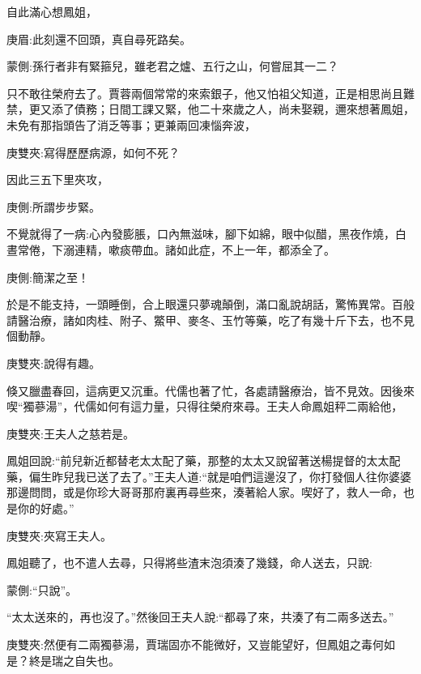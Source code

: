 \begin{parag}
    自此滿心想鳳姐，\begin{note}庚眉:此刻還不回頭，真自尋死路矣。\end{note}\begin{note}蒙側:孫行者非有緊箍兒，雖老君之爐、五行之山，何嘗屈其一二？\end{note}只不敢往榮府去了。賈蓉兩個常常的來索銀子，他又怕祖父知道，正是相思尚且難禁，更又添了債務；日間工課又緊，他二十來歲之人，尚未娶親，邇來想著鳳姐，未免有那指頭告了消乏等事；更兼兩回凍惱奔波，\begin{note}庚雙夾:寫得歷歷病源，如何不死？\end{note}因此三五下里夾攻，\begin{note}庚側:所謂步步緊。\end{note}不覺就得了一病:心內發膨脹，口內無滋味，腳下如綿，眼中似醋，黑夜作燒，白晝常倦，下溺連精，嗽痰帶血。諸如此症，不上一年，都添全了。\begin{note}庚側:簡潔之至！\end{note}於是不能支持，一頭睡倒，合上眼還只夢魂顛倒，滿口亂說胡話，驚怖異常。百般請醫治療，諸如肉桂、附子、鱉甲、麥冬、玉竹等藥，吃了有幾十斤下去，也不見個動靜。\begin{note}庚雙夾:說得有趣。\end{note}
\end{parag}


\begin{parag}
    倏又臘盡春回，這病更又沉重。代儒也著了忙，各處請醫療治，皆不見效。因後來喫“獨蔘湯”，代儒如何有這力量，只得往榮府來尋。王夫人命鳳姐秤二兩給他，\begin{note}庚雙夾:王夫人之慈若是。\end{note}鳳姐回說:“前兒新近都替老太太配了藥，那整的太太又說留著送楊提督的太太配藥，偏生昨兒我已送了去了。”王夫人道:“就是咱們這邊沒了，你打發個人往你婆婆那邊問問，或是你珍大哥哥那府裏再尋些來，湊著給人家。喫好了，救人一命，也是你的好處。”\begin{note}庚雙夾:夾寫王夫人。\end{note}鳳姐聽了，也不遣人去尋，只得將些渣末泡須湊了幾錢，命人送去，只說:\begin{note}蒙側:“只說”。\end{note}“太太送來的，再也沒了。”然後回王夫人說:“都尋了來，共湊了有二兩多送去。”\begin{note}庚雙夾:然便有二兩獨蔘湯，賈瑞固亦不能微好，又豈能望好，但鳳姐之毒何如是？終是瑞之自失也。\end{note}
\end{parag}


